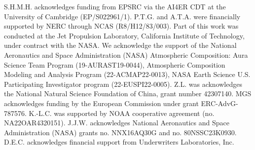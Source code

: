 \documentclass[gmd, manuscript]{copernicus}
\begin{document}




\begin{acknowledgements}
S.H.M.H. acknowledges funding from EPSRC via the AI4ER CDT at the University of Cambridge (EP/S022961/1). P.T.G. and A.T.A. were financially supported by NERC through NCAS (R8/H12/83/003).  Part of this work was conducted at the Jet Propulsion Laboratory, California Institute of Technology, under contract with the NASA. We acknowledge the support of the National Aeronautics and Space Administration (NASA) Atmospheric Composition: Aura Science Team Program (19-AURAST19-0044), Atmospheric Composition Modeling and Analysis Program (22-ACMAP22-0013), NASA Earth Science U.S. Participating Investigator program (22-EUSPI22-0005).
Z.L. was acknowledges the National Natural Science Foundation of China,  grant number 42307140. MGS acknowledges funding by the European Commission under grant ERC-AdvG-787576.  K.-L.C. was supported by NOAA cooperative agreement (no. NA22OAR4320151).  J.J.W. acknowledges National Aeronautics and Space Administration (NASA) grants no. NNX16AQ30G and no. 80NSSC23K0930.  D.E.C. acknowledges financial support from Underwriters Laboratories, Inc.


\end{acknowledgements}






\end{document}
